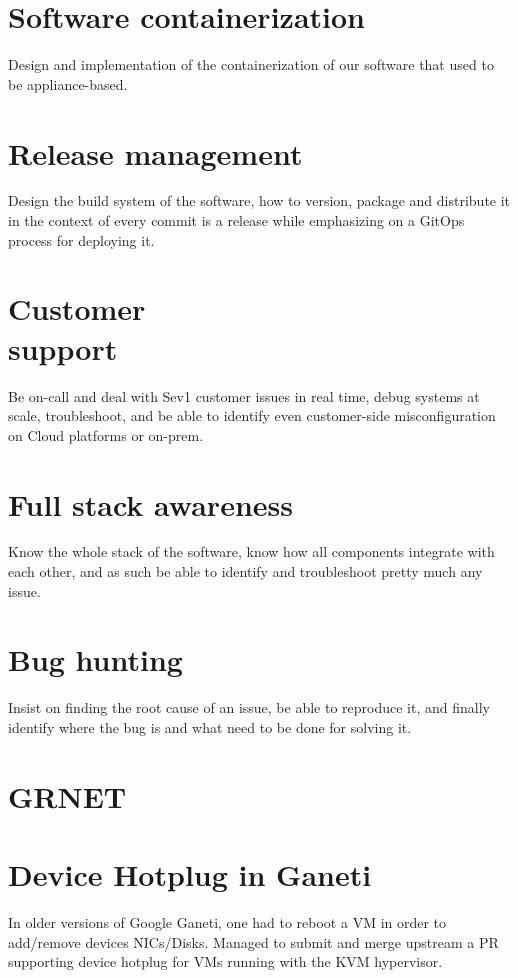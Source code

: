 \documentclass[margin,centered]{res}
\begin{document}
\begin{resume}
\section{\sc Software containerization}
Design and implementation of the containerization of our software
that used to be appliance-based.

\section{\sc Release management}
Design the build system of the software, how to version, package and distribute
it in the context of every commit is a release while emphasizing on a GitOps
process for deploying it.

\section{\sc Customer\\support}
Be on-call and deal with Sev1 customer issues in real time, debug systems at
scale, troubleshoot, and be able to identify even customer-side
misconfiguration on Cloud platforms or on-prem.

\section{\sc Full stack awareness}
Know the whole stack of the software, know how all components integrate with
each other, and as such be able to identify and troubleshoot pretty much any
issue.

\section{\sc Bug hunting}
Insist on finding the root cause of an issue, be able to reproduce it, and
finally identify where the bug is and what need to be done for solving it.


\section{GRNET}

\section{\sc Device Hotplug in Ganeti}
In older versions of Google Ganeti, one had to reboot a VM in order to
add/remove devices NICs/Disks. Managed to submit and merge upstream a PR
supporting device hotplug for VMs running with the KVM hypervisor.


\end{resume}
\end{document}
